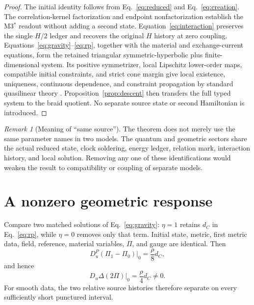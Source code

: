 \documentclass[11pt]{article}
\theoremstyle{definition}
\theoremstyle{remark}
\newtheorem{remark}[theorem]{Remark}
\begin{document}
\begin{proof}
The initial identity follows from Eq.~\eqref{eq:reduced} and Eq.~\eqref{eq:creation}. The correlation-kernel factorization and endpoint nonfactorization establish the M3$^*$ readout without adding a second state. Equation~\eqref{eq:interaction} preserves the single $H/2$ ledger and recovers the original $H$ history at zero coupling. Equations~\eqref{eq:gravity}--\eqref{eq:rp}, together with the material and exchange-current equations, form the retained triangular symmetric-hyperbolic plus finite-dimensional system. Its positive symmetrizer, local Lipschitz lower-order maps, compatible initial constraints, and strict cone margin give local existence, uniqueness, continuous dependence, and constraint propagation by standard quasilinear theory \cite{choquet2008}. Proposition~\ref{prop:descent} then transfers the full typed system to the braid quotient. No separate source state or second Hamiltonian is introduced.
\end{proof}

\begin{remark}[Meaning of ``same source'']
The theorem does not merely use the same parameter names in two models. The quantum and geometric sectors share the actual reduced state, clock soldering, energy ledger, relation mark, interaction history, and local solution. Removing any one of these identifications would weaken the result to compatibility or coupling of separate models.
\end{remark}

\section{A nonzero geometric response}

Compare two matched solutions of Eq.~\eqref{eq:gravity}: $\eta=1$ retains $d_C$ in Eq.~\eqref{eq:rp}, while $\eta=0$ removes only that term. Initial state, metric, first metric data, field, reference, material variables, $\Pi$, and gauge are identical. Then
\begin{equation}
  D_u^P(\Pi_1-\Pi_0)|_0=\frac{\rho}{8}d_C,
\end{equation}
and hence
\begin{equation}\label{eq:stressslope}
  D_u\Delta(2\Pi)|_0=\frac{\rho}{4}d_C\ne0.
\end{equation}
For smooth data, the two relative source histories therefore separate on every sufficiently short punctured interval.
\end{document}
